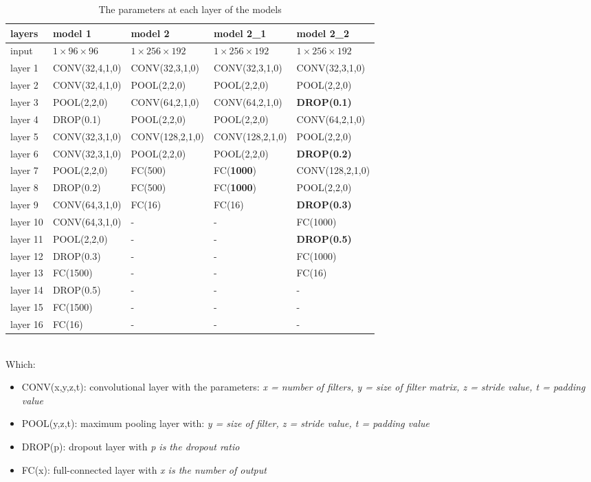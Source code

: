 \documentclass[12pt,a4paper]{article}
\begin{document}
\begin{table}[h!]
	\centering
	\begin{tabular}{l p{3cm} p{3cm} p{3cm} p{3cm}}
		layers & model 1 & model 2 & model 2\_1 & model 2\_2 \\ \hline
		input & $ 1 \times 96 \times 96$ & $1 \times 256 \times 192$ & $1 \times 256 \times 192$ & $1 \times 256 \times 192$ \\ \hline
 		layer 1 & CONV(32,4,1,0) & CONV(32,3,1,0) & CONV(32,3,1,0) & CONV(32,3,1,0) \\ \hline
		layer 2 & CONV(32,4,1,0) & POOL(2,2,0) & POOL(2,2,0) & POOL(2,2,0) \\ \hline
		layer 3 & POOL(2,2,0) & CONV(64,2,1,0) & CONV(64,2,1,0) & \textbf{DROP(0.1)} \\ \hline
		layer 4 & DROP(0.1) & POOL(2,2,0) & POOL(2,2,0) & CONV(64,2,1,0) \\ \hline
		layer 5 & CONV(32,3,1,0) & CONV(128,2,1,0) & CONV(128,2,1,0) & POOL(2,2,0) \\ \hline
		layer 6 & CONV(32,3,1,0) & POOL(2,2,0) & POOL(2,2,0) & \textbf{DROP(0.2)} \\ \hline
		layer 7 & POOL(2,2,0)  & FC(500) & FC(\textbf{1000}) & CONV(128,2,1,0) \\ \hline
		layer 8 & DROP(0.2) & FC(500) & FC(\textbf{1000}) & POOL(2,2,0) \\ \hline
		layer 9 & CONV(64,3,1,0)  & FC(16) & FC(16) & \textbf{DROP(0.3)} \\ \hline
		layer 10 & CONV(64,3,1,0)  & - & - & FC(1000) \\ \hline
		layer 11 & POOL(2,2,0) & - & - & \textbf{DROP(0.5)} \\ \hline
		layer 12 & DROP(0.3) & - & - & FC(1000) \\ \hline
		layer 13 & FC(1500) & - & - & FC(16) \\ \hline
		layer 14 & DROP(0.5) & - & - & - \\ \hline
		layer 15 & FC(1500) & - & - & - \\ \hline
		layer 16 & FC(16) & - & - & - \\ \hline
	\end{tabular}
	\caption{The parameters at each layer of the models}
	\label{modelparameters}
\end{table}~\\
Which:
\begin{itemize}
	\item CONV(x,y,z,t): convolutional layer with the parameters: \textit{x = number of filters, y = size of filter matrix, z = stride value, t = padding value}
	\item POOL(y,z,t): maximum pooling layer with: \textit{y = size of filter, z = stride value, t = padding value}
	\item DROP(p): dropout layer with \textit{p is the dropout ratio}
	\item FC(x): full-connected layer with \textit{x is the number of output}
\end{itemize}
\end{document}
